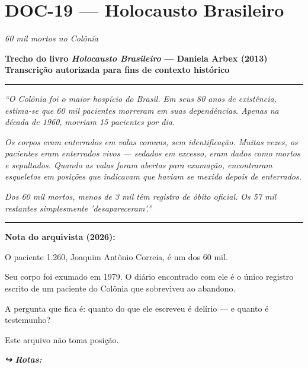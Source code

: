 \section*{\textbf{DOC-19} --- Holocausto Brasileiro}

\noindent \textit{60 mil mortos no Colônia}

\noindent \textbf{Trecho do livro \textit{Holocausto Brasileiro} --- Daniela Arbex (2013)}
\textbf{Transcrição autorizada para fins de contexto histórico}

\vspace{0.5em}\noindent\rule{\textwidth}{0.5pt}\vspace{0.5em}

\noindent \textit{\textquotedblleft{}O Colônia foi o maior hospício do Brasil. Em seus 80 anos de existência, estima-se que 60 mil pacientes morreram em suas dependências. Apenas na década de 1960, morriam 15 pacientes por dia.}

\noindent \textit{Os corpos eram enterrados em valas comuns, sem identificação. Muitas vezes, os pacientes eram enterrados vivos --- sedados em excesso, eram dados como mortos e sepultados. Quando as valas foram abertas para exumação, encontraram esqueletos em posições que indicavam que haviam se mexido depois de enterrados.}

\noindent \textit{Dos 60 mil mortos, menos de 3 mil têm registro de óbito oficial. Os 57 mil restantes simplesmente 'desapareceram'.\textquotedblright{}}

\vspace{0.5em}\noindent\rule{\textwidth}{0.5pt}\vspace{0.5em}

\noindent \textbf{Nota do arquivista (2026):}

\noindent O paciente 1.260, Joaquim Antônio Correia, é um dos 60 mil.

\noindent Seu corpo foi exumado em 1979. O diário encontrado com ele é o único registro escrito de um paciente do Colônia que sobreviveu ao abandono.

\noindent A pergunta que fica é: quanto do que ele escreveu é delírio --- e quanto é testemunho?

\noindent Este arquivo não toma posição.

\vspace{0.5em}
\noindent\textit{\textbf{↪ Rotas:}  \rotasep {} \rotasep {}}